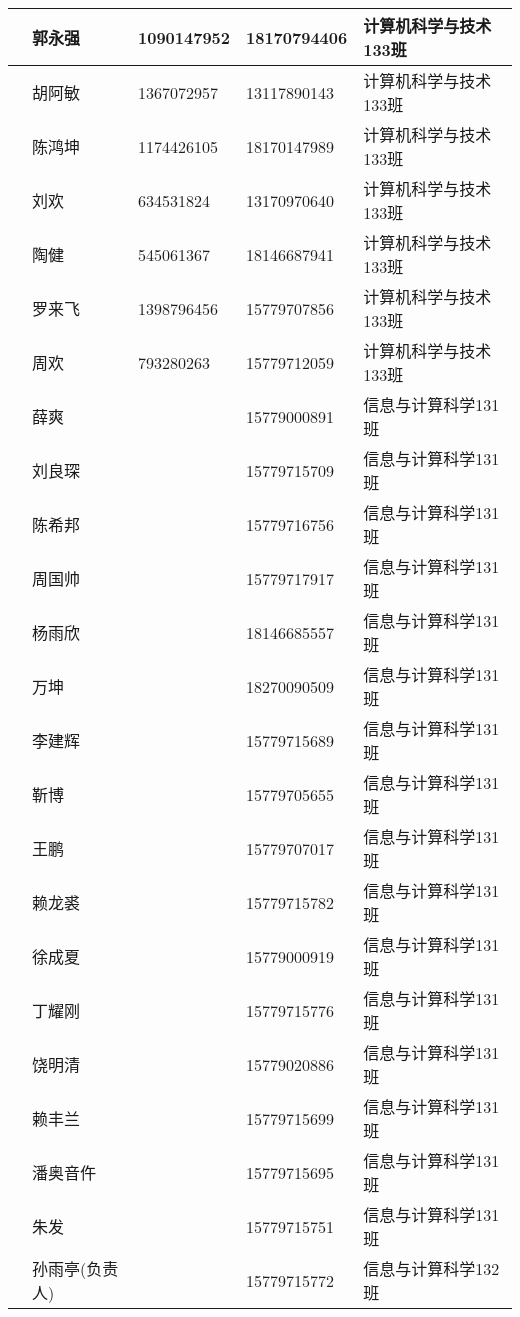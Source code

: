 \documentclass[12pt,a4paper]{article}
\begin{document}
\begin{CJK}{UTF8}{gbsn}
\begin{flushleft}
\begin{longtable}{|l|l|l|l|l|}
     & 郭永强 & 1090147952 & 18170794406 & 计算机科学与技术133班 \\ \hline
     & 胡阿敏 & 1367072957 & 13117890143 & 计算机科学与技术133班 \\ \hline
     & 陈鸿坤 & 1174426105 & 18170147989 & 计算机科学与技术133班 \\ \hline
     & 刘欢   & 634531824  & 13170970640 & 计算机科学与技术133班 \\ \hline
     & 陶健   & 545061367  & 18146687941 & 计算机科学与技术133班 \\ \hline
     & 罗来飞 & 1398796456 & 15779707856 & 计算机科学与技术133班 \\ \hline
     & 周欢   & 793280263  & 15779712059 & 计算机科学与技术133班 \\ \hline


     & 薛爽     &  & 15779000891 & 信息与计算科学131班 \\ \hline
     & 刘良琛   &  & 15779715709 & 信息与计算科学131班 \\ \hline
     & 陈希邦   &  & 15779716756 & 信息与计算科学131班 \\ \hline
     & 周国帅   &  & 15779717917 & 信息与计算科学131班 \\ \hline
     & 杨雨欣	&  & 			18146685557 & 信息与计算科学131班 \\ \hline 
     & 万坤		&  & 			18270090509 & 信息与计算科学131班 \\ \hline 
     & 李建辉	&  & 			15779715689 & 信息与计算科学131班 \\ \hline 
     & 靳博		&  & 			15779705655 & 信息与计算科学131班 \\ \hline 
     & 王鹏		&  & 			15779707017 & 信息与计算科学131班 \\ \hline 
     & 赖龙裘	&  & 			15779715782 & 信息与计算科学131班 \\ \hline 
     & 徐成夏	&  & 			15779000919 & 信息与计算科学131班 \\ \hline 
     & 丁耀刚	&  & 			15779715776 & 信息与计算科学131班 \\ \hline 
     & 饶明清	&  & 			15779020886 & 信息与计算科学131班 \\ \hline 
     & 赖丰兰	&  & 			15779715699 & 信息与计算科学131班 \\ \hline 
     & 潘奥音仵	&  & 			15779715695 & 信息与计算科学131班 \\ \hline 
     & 朱发		&  & 			15779715751 & 信息与计算科学131班 \\ \hline 
     & 孙雨亭(负责人)	&  & 			15779715772 & 信息与计算科学132班 \\ \hline 

\end{longtable}
\end{flushleft}
\end{CJK}
\end{document}
